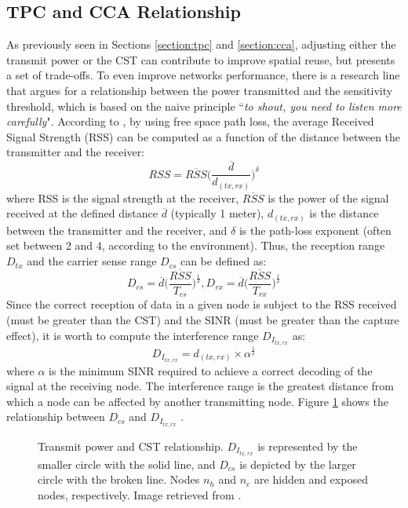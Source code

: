 \documentclass[12pt, a4paper,twoside]{tesi_upf}
\begin{document}
		\subsection{TPC and CCA Relationship}
		\label{section:tpc_cst_relationship}
			As previously seen in Sections \ref{section:tpc} and \ref{section:cca}, adjusting either the transmit power or the CST can contribute to improve spatial reuse, but presents a set of trade-offs. To even improve networks performance, there is a research line that argues for a relationship between the power transmitted and the sensitivity threshold, which is based on the naive principle ``\textit{to shout, you need to listen more carefully}". According to \cite{thorpe2014survey}, by using free space path loss, the average Received Signal Strength (RSS) can be computed as a function of the distance between the transmitter and the receiver:		
			\begin{equation}
				RSS = \overline{RSS} \Big( \frac{\overline{d}}{d_{(tx,rx)}} \Big)^{\delta}
				\nonumber
			\end{equation}
			where RSS is the signal strength at the receiver, $\overline{RSS}$ is the power of the signal received at the defined distance $\overline{d}$ (typically 1 meter), $d_{(tx,rx)}$ is the distance between the transmitter and the receiver, and $\delta$ is the path-loss exponent (often set between 2 and 4, according to the environment).  Thus, the reception range $D_{tx}$ and the carrier sense range $D_{cs}$ can be defined as:
			\begin{equation}
				D_{cs} = \overline{d} \Big( \frac{\overline{RSS}}{T_{cs}} \Big)^\frac{1}{\delta}, 				D_{rx} = \overline{d} \Big( \frac{\overline{RSS}}{T_{rx}} \Big)^\frac{1}{\delta}
				\nonumber
			\end{equation}
			Since the correct reception of data in a given node is subject to the RSS received (must be greater than the CST) and the SINR (must be greater than the capture effect), it is worth to compute the interference range $D_{I_{tx,rx}}$ as:					
			\begin{equation}
				D_{I_{tx,rx}} = d_{(tx,rx)} \times \alpha ^{\frac{1}{\delta}}
				\nonumber
			\end{equation}			
			where $\alpha$ is the minimum SINR required to achieve a correct decoding of the signal at the receiving node. The interference range is the greatest distance from which a node can be affected by another transmitting node. Figure \ref{fig:tx_cca_relation} shows the relationship between $D_{cs}$ and $D_{I_{tx,rx}}$ . 
			\begin{figure}[h!]
				\centering
				\caption{Transmit power and CST relationship. $D_{I_{tx,rx}}$ is represented by the smaller circle with the solid line, and $D_{cs}$ is depicted by the larger circle with the broken line. Nodes $n_h$ and $n_e$ are hidden and exposed nodes, respectively. Image retrieved from \cite{thorpe2014survey}.}
				\label{fig:tx_cca_relation}
			\end{figure}	
			
\end{document}

